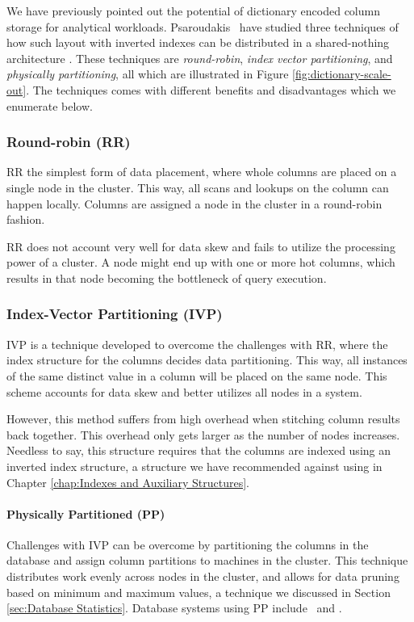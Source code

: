 
We have previously pointed out the potential of dictionary encoded column storage for analytical workloads. Psaroudakis \ea~have studied three techniques of how such layout with inverted indexes can be distributed in a shared-nothing architecture \cite{Psaroudakis2015-lc}. These techniques are \textit{round-robin}, \textit{index vector partitioning}, and \textit{physically partitioning}, all which are illustrated in Figure \ref{fig:dictionary-scale-out}. The techniques comes with different benefits and disadvantages which we enumerate below.

\subsubsection{Round-robin (RR)}
\label{ssub:Round-robin (RR)}
RR the simplest form of data placement, where whole columns are placed on a single node in the cluster. This way, all scans and lookups on the column can happen locally. Columns are assigned a node in the cluster in a round-robin fashion.

RR does not account very well for data skew and fails to utilize the processing power of a cluster. A node might end up with one or more hot columns, which results in that node becoming the bottleneck of query execution.

\subsubsection{Index-Vector Partitioning (IVP)}
\label{ssub:Index-Vector Partitioning (IVP)}
IVP is a technique developed to overcome the challenges with RR, where the index structure for the columns decides data partitioning. This way, all instances of the same distinct value in a column will be placed on the same node. This scheme accounts for data skew and better utilizes all nodes in a system.

However, this method suffers from high overhead when stitching column results back together. This overhead only gets larger as the number of nodes increases. Needless to say, this structure requires that the columns are indexed using an inverted index structure, a structure we have recommended against using in Chapter \ref{chap:Indexes and Auxiliary Structures}.

\paragraph{Physically Partitioned (PP)}
\label{par:Physically Partitioned (PP)}
Challenges with IVP can be overcome by partitioning the columns in the database and assign column partitions to machines in the cluster. This technique distributes work evenly across nodes in the cluster, and allows for data pruning based on minimum and maximum values, a technique we discussed in Section \ref{sec:Database Statistics}. Database systems using PP include \oracle~and \saph.

